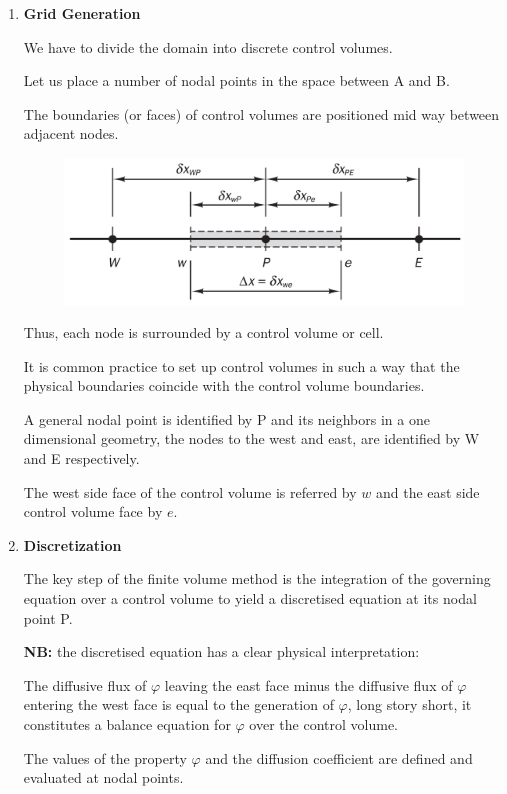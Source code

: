\documentclass[a4paper, 15pt]{article}
\begin{document}
	\begin{enumerate}
		\item \textbf{Grid Generation} 
		
		We have to divide the domain into discrete control volumes. 
		
		Let us place a number of nodal points in the space between A and B. 
		
		The boundaries (or faces) of
		control volumes are positioned mid way between adjacent nodes. 
		\begin{figure}[H]
			\centering
			\includegraphics[width=0.5\linewidth]{fig/screenshot007}
			\label{fig:screenshot007}
		\end{figure}
		Thus,
		each node is surrounded by a control volume or cell. 
		
		It is common practice to set up
		control volumes in such a way that the physical boundaries coincide with the control volume
		boundaries. \newline 
		
		A
		general nodal point is identified by P and its neighbors in a one dimensional geometry, the
		nodes to the west and east, are identified by W and E respectively. 
		
		The
		west side face of the control volume is referred by $w$ and the east side control volume face
		by $e$.
		
		\item \textbf{Discretization} 
		
		The
		key step of the finite volume method is the integration of the governing equation over a control volume to yield a discretised equation at its nodal point P. \newline 
		
		\textbf{NB:} the discretised equation has a
		clear physical interpretation: 
		
		The diffusive flux of $\varphi$ leaving the east face minus the diffusive flux
		of $\varphi$ entering the west face is equal to the generation of $\varphi$, long story short, it constitutes a balance equation
		for $\varphi$ over the control volume. \newline 
		
		The values of the property $\varphi$ and the diffusion coefficient are
		defined and evaluated at nodal points. \newline 
		

\end{enumerate}
\end{document}
